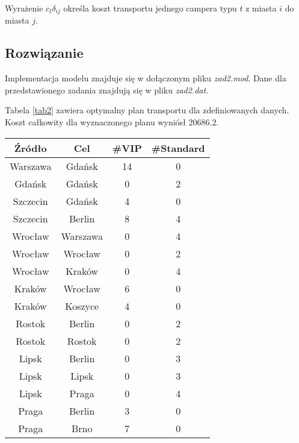 \documentclass{article}
\begin{document}
        Wyrażenie $c_t \delta_{ij}$ określa koszt transportu jednego campera typu $t$ z miasta $i$ do miasta $j$.
    
    \subsection{Rozwiązanie}
    
        Implementacja modelu znajduje się w dołączonym pliku \textit{zad2.mod}. Dane dla przedstawionego zadania znajdują się w pliku \textit{zad2.dat}.
        
        Tabela \ref{tab2} zawiera optymalny plan transportu dla zdefiniowanych danych. Koszt całkowity dla wyznaczonego planu wyniósł $20686.2$.
        
        \begin{table}[H]
            \begin{center}
                \begin{tabular}{c|c|c|c}
                    \textbf{Źródło} & \textbf{Cel} & \textbf{\#VIP} & \textbf{\#Standard} \\
                    \hline
                    Warszawa  &  Gdańsk  & 14  & 0  \\ 
                    Gdańsk  &  Gdańsk  & 0  & 2  \\ 
                    Szczecin  &  Gdańsk  & 4  & 0  \\ 
                    Szczecin  &  Berlin  & 8  & 4  \\ 
                    Wrocław  &  Warszawa  & 0  & 4  \\ 
                    Wrocław  &  Wrocław  & 0  & 2  \\ 
                    Wrocław  &  Kraków  & 0  & 4  \\ 
                    Kraków  &  Wrocław  & 6  & 0  \\ 
                    Kraków  &  Koszyce  & 4  & 0  \\ 
                    Rostok  &  Berlin  & 0  & 2  \\ 
                    Rostok  &  Rostok  & 0  & 2  \\ 
                    Lipsk  &  Berlin  & 0  & 3  \\ 
                    Lipsk  &  Lipsk  & 0  & 3  \\ 
                    Lipsk  &  Praga  & 0  & 4  \\ 
                    Praga  &  Berlin  & 3  & 0  \\ 
                    Praga  &  Brno  & 7  & 0  \\ 

\end{tabular}
\end{center}
\end{table}
\end{document}

